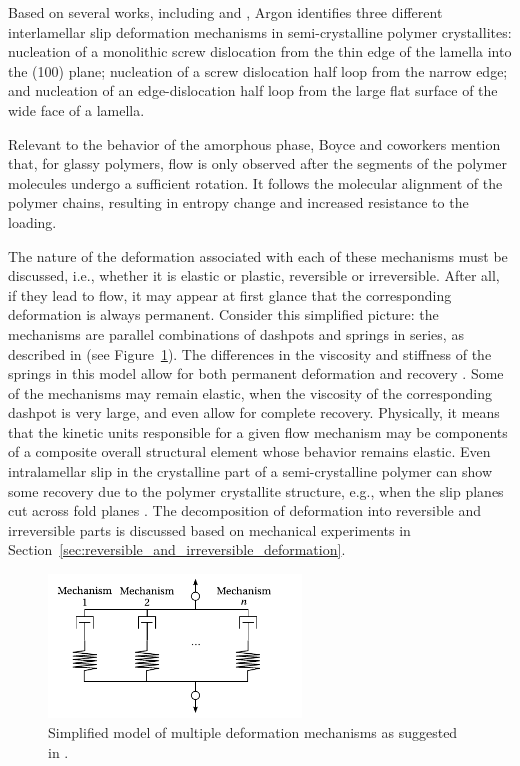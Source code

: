 Based on several works, including \cite{petersonThermalInitiationScrew1966} and \cite{linRateMechanismPlasticity1994}, Argon \citep{argonPhysicsDeformationFracture2013a} identifies three different interlamellar slip deformation mechanisms in semi-crystalline polymer crystallites: nucleation of a monolithic screw dislocation from the thin edge of the lamella into the (100) plane; nucleation of a screw dislocation half loop from the narrow edge; and nucleation of an edge-dislocation half loop from the large flat surface of the wide face of a lamella.

Relevant to the behavior of the amorphous phase, Boyce and coworkers \citep{boyceLargeInelasticDeformation1988} mention that, for glassy polymers, flow is only observed after the segments of the polymer molecules undergo a sufficient rotation.
It follows the molecular alignment of the polymer chains, resulting in entropy change and increased resistance to the loading.

The nature of the deformation associated with each of these mechanisms must be discussed, i.e., whether it is elastic or plastic, reversible or irreversible.
After all, if they lead to flow, it may appear at first glance that the corresponding deformation is always permanent.
Consider this simplified picture: the mechanisms are parallel combinations of dashpots and springs in series, as described in \cite{kellerIdentificationStructuralProcesses1971} (see Figure~\ref{fig:multi_def_mechs}).
The differences in the viscosity and stiffness of the springs in this model allow for both permanent deformation and recovery \citep{fotheringhamRoleRecoveryForces1978}.
Some of the mechanisms may remain elastic, when the viscosity of the corresponding dashpot is very large, and even allow for complete recovery.
Physically, it means that the kinetic units responsible for a given flow mechanism may be components of a composite overall structural element whose behavior remains elastic.
Even intralamellar slip in the crystalline part of a semi-crystalline polymer can show some recovery due to the polymer crystallite structure, e.g., when the slip planes cut across fold planes \citep{kellerIdentificationStructuralProcesses1971}.
The decomposition of deformation into reversible and irreversible parts is discussed based on mechanical experiments in Section~\ref{sec:reversible_and_irreversible_deformation}.
\begin{figure}[hbtp]
    \centering
    \includegraphics[width=0.6\textwidth]{figures/multi_def_mechs}
    \caption{Simplified model of multiple deformation mechanisms as suggested in \cite{kellerIdentificationStructuralProcesses1971}.}
\label{fig:multi_def_mechs}
\end{figure}

